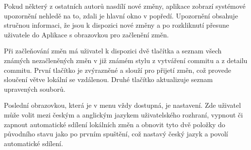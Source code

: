 Pokud některý z ostatních autorů nasdílí nové změny, aplikace zobrazí systémové upozornění nehledě na to, zdali je hlavní okno v popředí. Upozornění obsahuje stručnou informaci, že jsou k dispozici nové změny a po rozkliknutí přesune uživatele do Aplikace s obrazovkou pro začlenění změn.

Při začleňování změn má uživatel k dispozici dvě tlačítka a seznam všech známých nezačleněných změn v již známém stylu z vytváření commitu a z detailu commitu. První tlačítko je zvýrazněné a slouží pro přijetí změn, což provede sloučení větve lokální se vzdálenou. Druhé tlačítko aktualizuje seznam upravených souborů.

Poslední obrazovkou, která je v menu vždy dostupná, je nastavení. Zde uživatel může volit mezi českým a anglickým jazykem uživatelského rozhraní, vypnout či zapnout automatické sdílení lokálních změn a obnovit tyto dvě položky do původního stavu jako po prvním spuštění, což nastavý český jazyk a povolí automatické sdílení.
